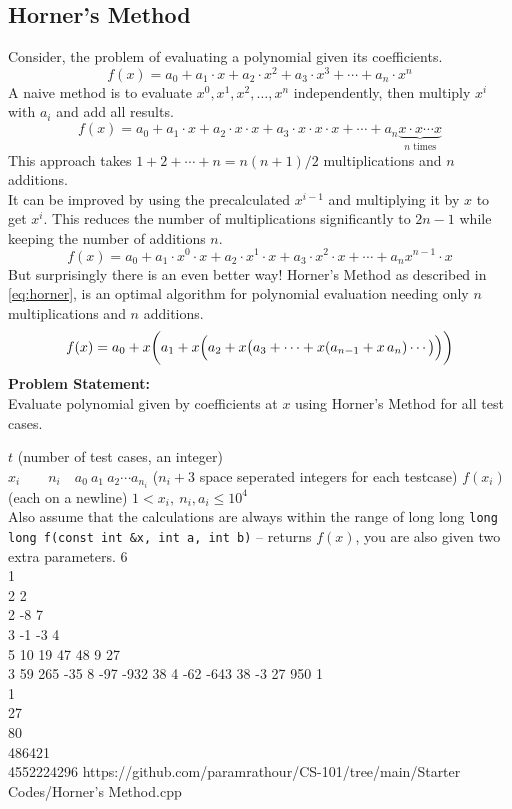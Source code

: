 \subsection{Horner's Method}
Consider, the problem of evaluating a polynomial given its coefficients.
\begin{equation*}
	f(x)=a_{0}+a_{1}\cdot x+a_{2}\cdot x^{2}+a_{3}\cdot x^{3}+\cdots +a_{n}\cdot x^{n}
\end{equation*}
A naive method is to evaluate $x^0, x^1, x^2, \ldots, x^n$ independently, then multiply $x^i$ with $a_i$ and add all results.
\begin{equation*}
	f(x)=a_{0}+a_{1}\cdot x+a_{2}\cdot x\cdot x+a_{3}\cdot x\cdot x\cdot x+\cdots +a_{n}\underbrace{x\cdot x\cdots x}_{n\text{ times}}
\end{equation*}
This approach takes $1+2+\cdots+n=n(n+1)/2$ multiplications and $n$ additions.\\
It can be improved by using the precalculated $x^{i-1}$ and multiplying it by $x$ to get $x^{i}$. This reduces the number of multiplications significantly to $2n-1$ while keeping the number of additions $n$.
\begin{equation*}
	f(x)=a_{0}+a_{1}\cdot x^0\cdot x+a_{2}\cdot x^1\cdot x+a_{3}\cdot x^2\cdot x+\cdots +a_{n}x^{n-1}\cdot x
\end{equation*}
But surprisingly there is an even better way! Horner's Method as described in \ref{eq:horner}, is an optimal algorithm for polynomial evaluation needing only $n$ multiplications and $n$ additions.
\begin{equation}{\label{eq:horner}}
	f(x)=a_{0}+x\bigg(a_{1}+x\Big(a_{2}+x\big(a_{3}+\cdots +x(a_{n-1}+x\,a_{n})\cdots \big)\Big)\bigg)
\end{equation}
\textbf{Problem Statement:}\\
Evaluate polynomial given by coefficients at $x$ using Horner's Method for all test cases.
\begin{testcasesFunction}
	{$t$ \hfill(number of test cases, an integer)\\
	$x_i\qquad n_i \quad a_0\ a_1\ a_2 \cdots a_{n_i}$ \hfill($n_i+3$ space seperated integers for each testcase)}
	{$f(x_i)$\hfill(each on a newline)}
	{$1 < x_i,\ n_i, a_i \leq 10^{4}$\\
	Also assume that the calculations are always within the range of long long}
	{\texttt{long long f(const int \&x, int a, int b)} -- returns $f(x)$, you are also given two extra parameters.}
	{6\\1\\2 2\\2 -8 7\\3 -1 -3 4\\5 10 19 47 48 9 27\\3 59 265 -35 8 -97 -932 38 4 -62 -643 38 -3 27 950}
	{1\\1\\27\\80\\486421\\4552224296}
	{https://github.com/paramrathour/CS-101/tree/main/Starter Codes/Horner's Method.cpp}
\end{testcasesFunction}
